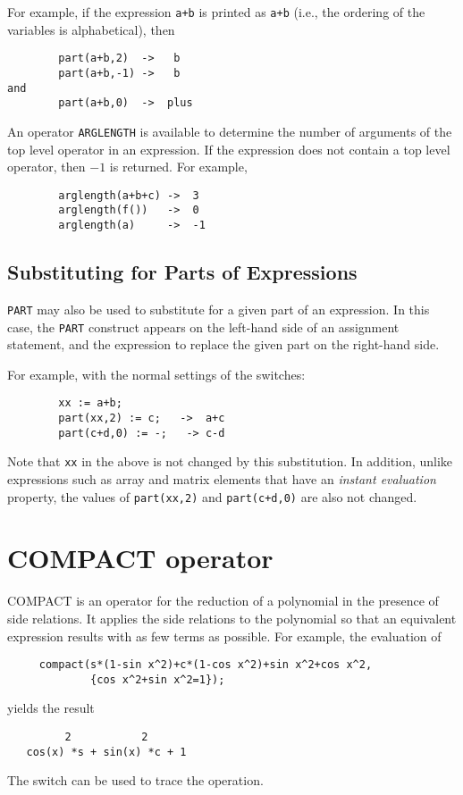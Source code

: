 For example, if the expression \texttt{a+b} is printed as \texttt{a+b} (i.e.,
the ordering of the variables is alphabetical), then
\begin{verbatim}
        part(a+b,2)  ->   b
        part(a+b,-1) ->   b
and
        part(a+b,0)  ->  plus
\end{verbatim}
\hypertarget{operator:ARGLENGTH}{}
An operator \texttt{ARGLENGTH} is available to determine
the number of arguments of the top level operator in an expression.  If
the expression does not contain a top level operator, then $-1$ is returned.
For example,
\begin{verbatim}
        arglength(a+b+c) ->  3
        arglength(f())   ->  0
        arglength(a)     ->  -1
\end{verbatim}

\subsection{Substituting for Parts of Expressions}

\texttt{PART} may also be used to substitute for a given part of an
expression.  In this case, the \texttt{PART} construct appears on the
left-hand side of an assignment statement, and the expression to replace
the given part on the right-hand side.

For example, with the normal settings of the {\REDUCE} switches:
\begin{verbatim}
        xx := a+b;
        part(xx,2) := c;   ->  a+c
        part(c+d,0) := -;   -> c-d
\end{verbatim}

Note that \texttt{xx} in the above is not changed by this substitution.  In
addition, unlike expressions such as array and matrix elements that have
an \emph{instant evaluation\/} property, the values
of \texttt{part(xx,2)} and \texttt{part(c+d,0)} are also not changed.


\section{COMPACT operator}

COMPACT is an operator for the reduction of a polynomial in the
presence of side relations.  It applies the side relations to the
polynomial so that an equivalent expression results with as few terms as
possible.  For example, the evaluation of
\begin{verbatim}
     compact(s*(1-sin x^2)+c*(1-cos x^2)+sin x^2+cos x^2,
             {cos x^2+sin x^2=1});
\end{verbatim}
yields the result
\begin{verbatim}
         2           2
   cos(x) *s + sin(x) *c + 1
\end{verbatim}
\hypertarget{switch:TRCOMPACT}{}
The switch  can be used to trace the operation.

